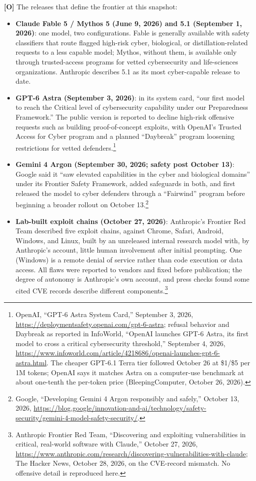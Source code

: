 \documentclass[11pt,letterpaper]{article}
\begin{document}
\textbf{[O]} The releases that define the frontier at this snapshot:
\begin{itemize}
  \item \textbf{Claude Fable 5 / Mythos 5 (June 9, 2026) and 5.1 (September 1, 2026)}: one model, two configurations. Fable is generally available with safety classifiers that route flagged high-risk cyber, biological, or distillation-related requests to a less capable model; Mythos, without them, is available only through trusted-access programs for vetted cybersecurity and life-sciences organizations. Anthropic describes 5.1 as its most cyber-capable release to date.
  \item \textbf{GPT-6 Astra (September 3, 2026)}: in its system card, ``our first model to reach the Critical level of cybersecurity capability under our Preparedness Framework.'' The public version is reported to decline high-risk offensive requests such as building proof-of-concept exploits, with OpenAI's Trusted Access for Cyber program and a planned ``Daybreak'' program loosening restrictions for vetted defenders.\footnote{OpenAI, ``GPT-6 Astra System Card,'' September 3, 2026, \url{https://deploymentsafety.openai.com/gpt-6-astra}; refusal behavior and Daybreak as reported in InfoWorld, ``OpenAI launches GPT-6 Astra, its first model to cross a critical cybersecurity threshold,'' September 4, 2026, \url{https://www.infoworld.com/article/4218686/openai-launches-gpt-6-astra.html}. The cheaper GPT-6.1 Terra tier followed October 26 at \$1/\$5 per 1M tokens; OpenAI says it matches Astra on a computer-use benchmark at about one-tenth the per-token price (BleepingComputer, October 26, 2026).}
  \item \textbf{Gemini 4 Argon (September 30, 2026; safety post October 13)}: Google said it ``saw elevated capabilities in the cyber and biological domains'' under its Frontier Safety Framework, added safeguards in both, and first released the model to cyber defenders through a ``Fairwind'' program before beginning a broader rollout on October 13.\footnote{Google, ``Developing Gemini 4 Argon responsibly and safely,'' October 13, 2026, \url{https://blog.google/innovation-and-ai/technology/safety-security/gemini-4-model-safety-security/}.}
  \item \textbf{Lab-built exploit chains (October 27, 2026)}: Anthropic's Frontier Red Team described five exploit chains, against Chrome, Safari, Android, Windows, and Linux, built by an unreleased internal research model with, by Anthropic's account, little human involvement after initial prompting. One (Windows) is a remote denial of service rather than code execution or data access. All flaws were reported to vendors and fixed before publication; the degree of autonomy is Anthropic's own account, and press checks found some cited CVE records describe different components.\footnote{Anthropic Frontier Red Team, ``Discovering and exploiting vulnerabilities in critical, real-world software with Claude,'' October 27, 2026, \url{https://www.anthropic.com/research/discovering-vulnerabilities-with-claude}; The Hacker News, October 28, 2026, on the CVE-record mismatch. No offensive detail is reproduced here.}
\end{itemize}
\end{document}

